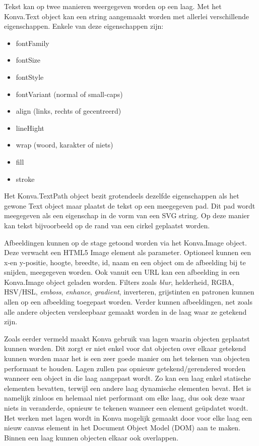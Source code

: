 Tekst kan op twee manieren weergegeven worden op een laag. Met het Konva.Text object kan een string aangemaakt worden met allerlei verschillende eigenschappen. Enkele van deze eigenschappen zijn: 

\begin{itemize}
	\item fontFamily
	\item fontSize
	\item fontStyle
	\item fontVariant (normal of small-caps)
	\item align (links, rechts of gecentreerd)
	\item lineHight 
	\item wrap (woord, karakter of niets)
	\item fill
	\item stroke
\end{itemize}

Het Konva.TextPath object bezit grotendeels dezelfde eigenschappen als het gewone Text object maar plaatst de tekst op een meegegeven pad. Dit pad wordt meegegeven als een eigenschap in de vorm van een SVG string. Op deze manier kan tekst bijvoorbeeld op de rand van een cirkel geplaatst worden. 

Afbeeldingen kunnen op de stage getoond worden via het Konva.Image object. Deze verwacht een HTML5 Image element als parameter. Optioneel kunnen een x-en y-positie, hoogte, breedte, id, naam en een object om de afbeelding bij te snijden, meegegeven worden. Ook vanuit een URL kan een afbeelding in een Konva.Image object geladen worden. Filters zoals \textit{blur}, helderheid, RGBA, HSV/HSL, \textit{emboss}, \textit{enhance}, \textit{gradient}, inverteren, grijstinten en patronen kunnen allen op een afbeelding toegepast worden. Verder kunnen afbeeldingen, net zoals alle andere objecten versleepbaar gemaakt worden in de laag waar ze getekend zijn. 

Zoals eerder vermeld maakt Konva gebruik van lagen waarin objecten geplaatst kunnen worden. Dit zorgt er niet enkel voor dat objecten over elkaar getekend kunnen worden maar het is een zeer goede manier om het tekenen van objecten performant te houden. Lagen zullen pas opnieuw getekend/gerendered worden wanneer een object in die laag aangepast wordt. Zo kan een laag enkel statische elementen bevatten, terwijl een andere laag dynamische elementen bevat. Het is namelijk zinloos en helemaal niet performant om elke laag, dus ook deze waar niets in veranderde, opnieuw te tekenen wanneer een element ge\"{u}pdatet wordt. Het werken met lagen wordt in Konva mogelijk gemaakt door voor elke laag een nieuw canvas element in het Document Object Model (DOM) aan te maken. Binnen een laag kunnen objecten elkaar ook overlappen. 


